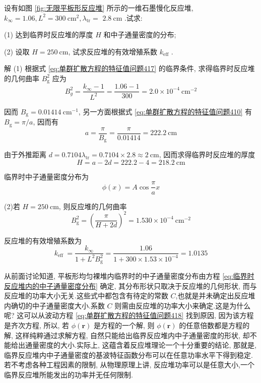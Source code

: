 \documentclass{Sichuan Normal University}
\begin{document}
\begin{example}

     设有如图 \ref{fig:无限平板形反应堆} 所示的一维石墨慢化反应堆, $k_{\infty}=1.06, L^2=300 \mathrm{~cm}^2, \lambda_{\mathrm{tr}}=$ $2.8 \mathrm{~cm}$ .试求:

(1) 达到临界时反应堆的厚度 $H$ 和中子通量密度的分布;

(2) 设取 $H=250 \mathrm{~cm}$, 试求反应堆的有效增殖系数 $k_{\mathrm{eff}}$ .

解 (1) 根据式 \eqref{eq:单群扩散方程的特征值问题417} 的临界条件, 求得临界时反应堆的几何曲率 $B_{\mathrm{g}}^2$ 应为
\begin{equation}
B_g^2=\frac{k_{\infty}-1}{L^2}=\frac{1.06-1}{300}=2.0 \times 10^{-4} \mathrm{~cm}^{-2}
\end{equation}

因而 $B_{\mathrm{g}}=0.01414 \mathrm{~cm}^{-1}$, 另一方面根据式 \eqref{eq:单群扩散方程的特征值问题410} 有 $B_{\mathrm{g}}=\pi / a$, 因而有
\begin{equation}
a=\frac{\pi}{B_{\mathrm{g}}}=\frac{\pi}{0.01414}=222.2 \mathrm{~cm}
\end{equation}

由于外推距离 $d=0.7104 \lambda_{\mathrm{tr}}=0.7104 \times 2.8 \approx 2 \mathrm{~cm}$, 因而求得临界时反应堆的厚度
\begin{equation}
H=a-2 d=222.2-4=218.2 \mathrm{~cm}
\end{equation}

临界时中子通量密度分布为
\begin{equation}
\phi(x)=A \cos \frac{\pi}{a} x
\end{equation}

(2)若 $H=250 \mathrm{~cm}$, 则反应堆的几何曲率
\begin{equation}
B_{\mathrm{g}}^2=\left(\frac{\pi}{H+2 d}\right)^2=1.530 \times 10^{-4} \mathrm{~cm}^{-2}
\end{equation}

反应堆的有效增殖系数为
\begin{equation}
k_{\text {eff }}=\frac{k_{\infty}}{1+L^2 B_{\mathrm{g}}^2}=\frac{1.06}{1+300 \times 1.53 \times 10^{-4}}=1.0135
\end{equation}
    
\end{example}


从前面讨论知道, 平板形均匀裸堆内临界时的中子通量密度分布由方程 \eqref{eq:临界时反应堆内的中子通量密度分布} 确定, 其分布形状只取决于反应堆的几何形状, 而与反应堆的功率大小无关.这些式中都包含有待定的常数 $C$,也就是并未确定出反应堆内确切的中子通量密度大小.系数 $C$ 则需由反应堆的功率大小来确定.这是为什么呢? 这可以从波动方程 \eqref{eq:单群扩散方程的特征值问题418} 找到原因, 因为该方程是齐次方程, 所以, 若 $\phi(\boldsymbol{r})$ 是方程的一个解, 则 $\phi(\boldsymbol{r})$ 的任意倍数都是方程的解, 这样纯粹通过求解方程, 自然只能给出临界反应堆内中子通量密度的形状, 却不能给出通量密度的大小.实际上, 这蕴含着反应堆理论一个十分重要的结论, 那就是, 临界反应堆内中子通量密度的基波特征函数分布可以在任意功率水平下得到稳定.若不考虑各种工程因素的限制, 从物理原理上讲, 反应堆功率可以是任意大小,一个临界反应堆所能发出的功率并无任何限制.
    
\end{document}
